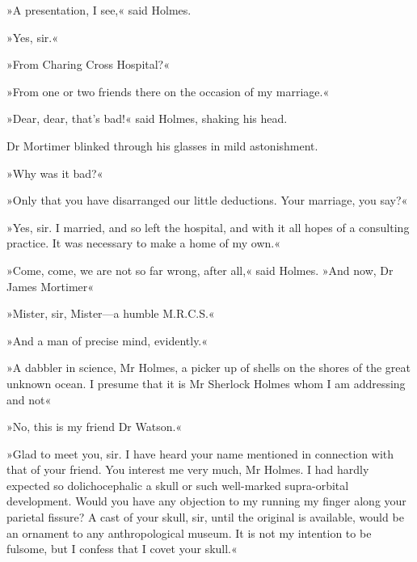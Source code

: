 »A presentation, I see,« said Holmes.

»Yes, sir.«

»From Charing Cross Hospital?«

»From one or two friends there on the occasion of my marriage.«

»Dear, dear, that's bad!« said Holmes, shaking his head.

Dr Mortimer blinked through his glasses in mild astonishment.

»Why was it bad?«

»Only that you have disarranged our little deductions. Your marriage, you say?«

»Yes, sir. I married, and so left the hospital, and with it all hopes of a consulting practice. It was necessary to make a home of my own.«

»Come, come, we are not so far wrong, after all,« said Holmes. »And now, Dr James Mortimer\longdash«


»Mister, sir, Mister—a humble M.R.C.S.«


»And a man of precise mind, evidently.«

»A dabbler in science, Mr Holmes, a picker up of shells on the shores of the great unknown ocean. I presume that it is Mr Sherlock Holmes whom I am addressing and not\longdash«

»No, this is my friend Dr Watson.«


»Glad to meet you, sir. I have heard your name mentioned in connection with that of your friend. You interest me very much, Mr Holmes. I had hardly expected so dolichocephalic a skull or such well-marked supra-orbital development. Would you have any objection to my running my finger along your parietal fissure? A cast of your skull, sir, until the original is available, would be an ornament to any anthropological museum. It is not my intention to be fulsome, but I confess that I covet your skull.«


